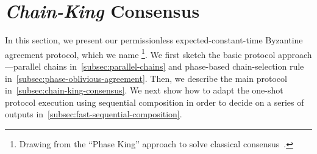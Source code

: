 \section{\emph{Chain-King} Consensus}
\label{sec:chain-king-consensus}

In this section, we present our permissionless expected-constant-time Byzantine agreement protocol, which we name \chainKingConsensus\footnote{Drawing from the ``Phase King'' approach to solve classical consensus~\cite{FOCS:BerGarPer89}.}.
%
We first sketch the basic protocol approach---parallel chains in~\cref{subsec:parallel-chains} and phase-based chain-selection rule in~\cref{subsec:phase-oblivious-agreement}.
%
Then, we describe the main protocol in~\cref{subsec:chain-king-consensus}.
%
We next show how to adapt the one-shot  protocol execution using sequential composition in order to decide on a series of outputs in~\cref{subsec:fast-sequential-composition}.





